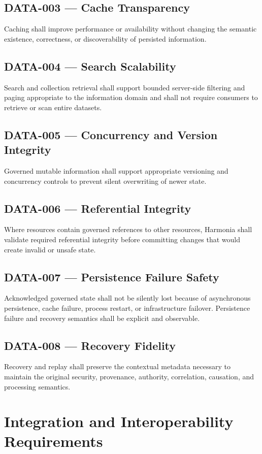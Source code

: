 \subsection{DATA-003 --- Cache Transparency}
Caching shall improve performance or availability without changing the semantic existence, correctness, or discoverability of persisted information.

\subsection{DATA-004 --- Search Scalability}
Search and collection retrieval shall support bounded server-side filtering and paging appropriate to the information domain and shall not require consumers to retrieve or scan entire datasets.

\subsection{DATA-005 --- Concurrency and Version Integrity}
Governed mutable information shall support appropriate versioning and concurrency controls to prevent silent overwriting of newer state.

\subsection{DATA-006 --- Referential Integrity}
Where resources contain governed references to other resources, Harmonia shall validate required referential integrity before committing changes that would create invalid or unsafe state.

\subsection{DATA-007 --- Persistence Failure Safety}
Acknowledged governed state shall not be silently lost because of asynchronous persistence, cache failure, process restart, or infrastructure failover. Persistence failure and recovery semantics shall be explicit and observable.

\subsection{DATA-008 --- Recovery Fidelity}
Recovery and replay shall preserve the contextual metadata necessary to maintain the original security, provenance, authority, correlation, causation, and processing semantics.

\section{Integration and Interoperability Requirements}

